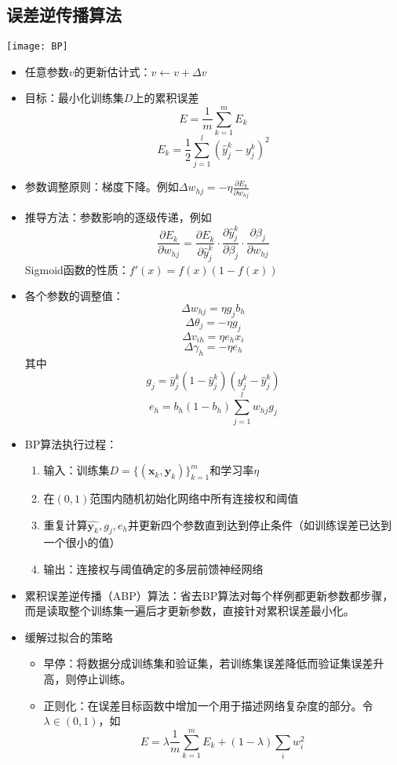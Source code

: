 \documentclass{ctexart}
\begin{document}
				\subsection{误差逆传播算法}
					\texttt{[image: BP]}
					\begin{itemize}
						\item 任意参数$v$的更新估计式：$v\leftarrow v+\Delta v$
						\item 目标：最小化训练集$D$上的累积误差\[E=\frac{1}{m}\sum_{k=1}^{m}E_k\]\[E_k=\frac{1}{2}\sum_{j=1}^{l}(\hat{y}_j^k-y_j^k)^2\]
						\item 参数调整原则：梯度下降。例如$\Delta w_{hj}=-\eta\frac{\partial E_k}{\partial w_{hj}}$
						\item 推导方法：参数影响的逐级传递，例如\[\frac{\partial E_k}{\partial w_{hj}}=\frac{\partial E_k}{\partial\hat{y}_j^k}\cdot\frac{\partial\hat{y}_j^k}{\partial\beta_j}\cdot\frac{\partial\beta_j}{\partial w_{hj}}\]Sigmoid函数的性质：$f'(x)=f(x)(1-f(x))$
						\item 各个参数的调整值：\[\Delta w_{hj}=\eta g_jb_h\]\[\Delta\theta_j=-\eta g_j\]\[\Delta v_{ih}=\eta e_hx_i\]\[\Delta\gamma_h=-\eta e_h\]其中\[g_j=\hat{y}_j^k(1-\hat{y}_j^k)(y_j^k-\hat{y}_j^k)\]\[e_h=b_h(1-b_h)\sum_{j=1}^{l}w_{hj}g_j\]
						\item BP算法执行过程：\begin{enumerate}[1.]
							\item 输入：训练集$D=\{(\bm{x}_k,\bm{y}_k)\}_{k=1}^m$和学习率$\eta$
							\item 在$(0,1)$范围内随机初始化网络中所有连接权和阈值
							\item 重复计算$\hat{\bm{y}_k},g_j,e_h$并更新四个参数直到达到停止条件（如训练误差已达到一个很小的值）
							\item 输出：连接权与阈值确定的多层前馈神经网络
						\end{enumerate}
						\item 累积误差逆传播（ABP）算法：省去BP算法对每个样例都更新参数都步骤，而是读取整个训练集一遍后才更新参数，直接针对累积误差最小化。
						\item 缓解过拟合的策略\begin{itemize}
							\item 早停：将数据分成训练集和验证集，若训练集误差降低而验证集误差升高，则停止训练。
							\item 正则化：在误差目标函数中增加一个用于描述网络复杂度的部分。令$\lambda\in(0,1)$，如\[E=\lambda\frac{1}{m}\sum_{k=1}^{m}E_k+(1-\lambda)\sum_{i}^{}w_i^2\]
						\end{itemize}
					\end{itemize}
\end{document}
